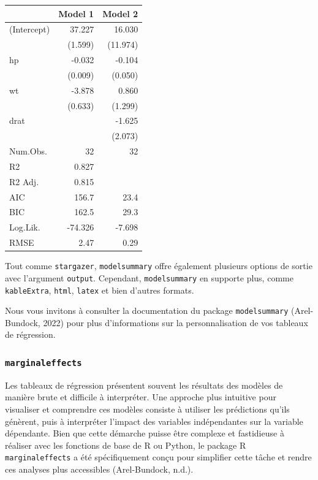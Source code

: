 \documentclass[
  letterpaper,
  DIV=11,
  numbers=noendperiod]{scrreprt}
\begin{document}
\begin{longtable}[]{@{}lrr@{}}
\toprule\noalign{}
& Model 1 & Model 2 \\
\midrule\noalign{}
\endhead
\bottomrule\noalign{}
\endlastfoot
(Intercept) & 37.227 & 16.030 \\
& (1.599) & (11.974) \\
hp & -0.032 & -0.104 \\
& (0.009) & (0.050) \\
wt & -3.878 & 0.860 \\
& (0.633) & (1.299) \\
drat & & -1.625 \\
& & (2.073) \\
Num.Obs. & 32 & 32 \\
R2 & 0.827 & \\
R2 Adj. & 0.815 & \\
AIC & 156.7 & 23.4 \\
BIC & 162.5 & 29.3 \\
Log.Lik. & -74.326 & -7.698 \\
RMSE & 2.47 & 0.29 \\
\end{longtable}

Tout comme \texttt{stargazer}, \texttt{modelsummary} offre également
plusieurs options de sortie avec l'argument \texttt{output}. Cependant,
\texttt{modelsummary} en supporte plus, comme \texttt{kableExtra},
\texttt{html}, \texttt{latex} et bien d'autres formats.

Nous vous invitons à consulter la documentation du package
\texttt{modelsummary} (Arel-Bundock, 2022) pour plus d'informations sur
la personnalisation de vos tableaux de régression.

\hypertarget{marginaleffects}{%
\subsubsection{\texorpdfstring{\texttt{marginaleffects}}{marginaleffects}}\label{marginaleffects}}

Les tableaux de régression présentent souvent les résultats des modèles
de manière brute et difficile à interpréter. Une approche plus intuitive
pour visualiser et comprendre ces modèles consiste à utiliser les
prédictions qu'ils génèrent, puis à interpréter l'impact des variables
indépendantes sur la variable dépendante. Bien que cette démarche puisse
être complexe et fastidieuse à réaliser avec les fonctions de base de R
ou Python, le package R \texttt{marginaleffects} a été spécifiquement
conçu pour simplifier cette tâche et rendre ces analyses plus
accessibles (Arel-Bundock, n.d.).
\end{document}
